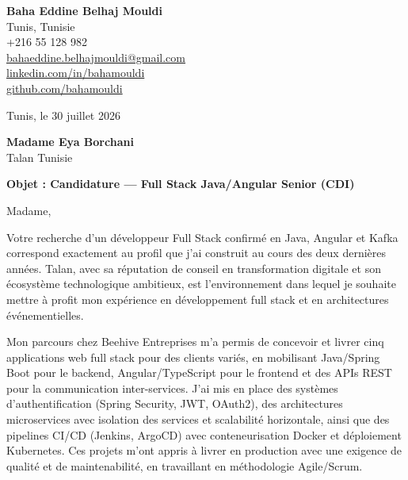 \documentclass[a4paper,11pt]{article}
\begin{document}
\begin{flushright}
{\bfseries Baha Eddine Belhaj Mouldi}\\
Tunis, Tunisie\\
+216 55 128 982\\
\href{mailto:bahaeddine.belhajmouldi@gmail.com}{bahaeddine.belhajmouldi@gmail.com}\\
\href{https://linkedin.com/in/bahamouldi}{linkedin.com/in/bahamouldi}\\
\href{https://github.com/bahamouldi}{github.com/bahamouldi}
\end{flushright}

\vspace{0.8cm}

\begin{flushleft}
Tunis, le 30 juillet 2026

\vspace{0.8cm}

{\bfseries Madame Eya Borchani}\\
Talan Tunisie

\vspace{0.6cm}

{\bfseries Objet : Candidature --- Full Stack Java/Angular Senior (CDI)}
\end{flushleft}

\vspace{0.6cm}

Madame,

Votre recherche d'un développeur Full Stack confirmé en Java, Angular et Kafka correspond exactement au profil que j'ai construit au cours des deux dernières années. Talan, avec sa réputation de conseil en transformation digitale et son écosystème technologique ambitieux, est l'environnement dans lequel je souhaite mettre à profit mon expérience en développement full stack et en architectures événementielles.

Mon parcours chez Beehive Entreprises m'a permis de concevoir et livrer cinq applications web full stack pour des clients variés, en mobilisant Java/Spring Boot pour le backend, Angular/TypeScript pour le frontend et des APIs REST pour la communication inter-services. J'ai mis en place des systèmes d'authentification (Spring Security, JWT, OAuth2), des architectures microservices avec isolation des services et scalabilité horizontale, ainsi que des pipelines CI/CD (Jenkins, ArgoCD) avec conteneurisation Docker et déploiement Kubernetes. Ces projets m'ont appris à livrer en production avec une exigence de qualité et de maintenabilité, en travaillant en méthodologie Agile/Scrum.
\end{document}
